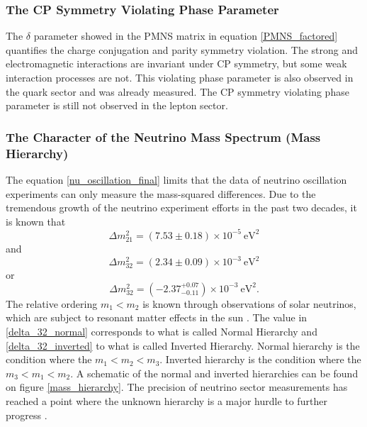 
\subsubsection{The CP Symmetry Violating Phase Parameter}

The $\delta$ parameter showed in the PMNS matrix in equation \ref{PMNS_factored} quantifies the charge conjugation and parity symmetry violation. The strong and electromagnetic interactions are invariant under CP symmetry, but some weak interaction processes are not. This violating phase parameter is also observed in the quark sector and was already measured. The CP symmetry violating phase parameter is still not observed in the lepton sector.

\subsubsection{The Character of the Neutrino Mass Spectrum (Mass Hierarchy)}

The equation \ref{nu_oscillation_final} limits that the data of neutrino oscillation experiments can only measure the mass-squared differences. Due to the tremendous growth of the neutrino experiment efforts in the past two decades, it is known that \cite{delta_2_1}
%
\begin{equation}
	\Delta m^2_{21} = (7.53 \pm 0.18) \times 10^{-5} \ \text{eV}^2
	\label{delta_21}
\end{equation}
%
and \cite{delta_3_2}
%
\begin{equation}
	\Delta m^2_{32} = (2.34 \pm 0.09) \times 10^{-3} \ \text{eV}^2
	\label{delta_32_normal}
\end{equation}
%
or 
%
\begin{equation}
	\Delta m^2_{32} = (-2.37^{+0.07}_{-0.11}) \times 10^{-3} \ \text{eV}^2.
	\label{delta_32_inverted}
\end{equation}
%
The relative ordering $m_1 < m_2$ is known through observations of solar neutrinos, which are subject to resonant matter effects in the sun \cite{delta_2_1}. The value in \ref{delta_32_normal} corresponds to what is called Normal Hierarchy and \ref{delta_32_inverted} to what is called Inverted Hierarchy. Normal hierarchy is the condition where the $m_1 < m_2 < m_3$. Inverted hierarchy is the condition where the $m_3 < m_1 < m_2$. A schematic of the normal and inverted hierarchies can be found on figure \ref{mass_hierarchy}. The precision of neutrino sector measurements has reached a point where the unknown hierarchy is a major hurdle to further progress \cite{prospects_patterson}.

